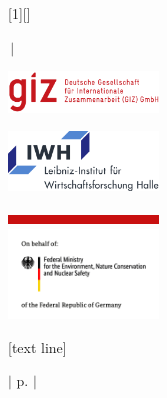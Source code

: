 \renewcommand{\inserttitlegraphic}{
\parbox[b][2cm][t]{4cm}{\includegraphics[width = 4cm, keepaspectratio]{pictures/GIZ_Logo.png}}  \hspace{0.1cm} \parbox[b][2cm][t]{4cm}{\includegraphics[width = 4cm, keepaspectratio]{pictures/IWH_Logo_RGB_DE_Grossformat.png}} \hfill \parbox[b][2cm][t]{3.21cm}{\includegraphics[keepaspectratio,width=4.00cm]{pictures/seperationbar.png} \\ \includegraphics[width = 4cm, keepaspectratio]{pictures/BMWI_logo.png}}
}
[1][]
{	
	\vspace{2.75cm}
  \begin{center}\textbf{\inserttitle}\end{center}\par
  \begin{center}\insertsubtitle\end{center}\par
  \insertauthor $\, \vert$ \insertdate \par
  \insertinstitute\par
	\vspace{0.25cm}
  \inserttitlegraphic
}


[text line]{%
  \parbox{\linewidth}{\vspace*{-8pt} $\vert$ p.\insertframenumber{} $\vert$ \hfill}}


\linespread{1.2}




